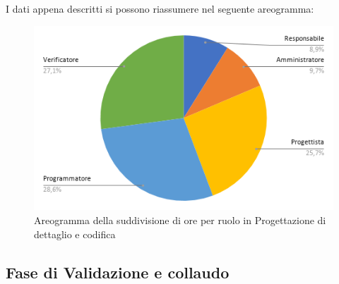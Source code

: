 I dati appena descritti si possono riassumere nel seguente areogramma:
\begin{figure}[!h]
    \vspace{5px}
    \includegraphics[scale=0.5]{../../../Images/Diagrammi/Diagramma a torta/ore codifica.png}
    \centering
    \caption{Areogramma della suddivisione di ore per ruolo in Progettazione di dettaglio e codifica}
\end{figure}



\subsection{Fase di Validazione e collaudo}

